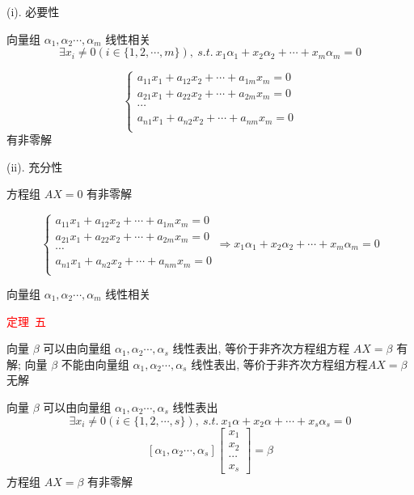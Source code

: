 \begin{theorem}[判别线性相关性的七大定理]
	\begin{anymark}[证明]
		(i). 必要性
		
		向量组 $\alpha_{1},\alpha_{2}\cdots,\alpha_{m}$ 线性相关  
		$$\exists x_{i}\neq 0(i\in \{1,2,\cdots,m\}),\ s.t.\ x_{1}\alpha_{1}+x_{2}\alpha_{2}+\cdots+x_{m}\alpha_{m}=0$$

		$$\begin{cases}
			a_{11}x_{1}+a_{12}x_{2}+\cdots+a_{1m}x_{m}=0\\
			a_{21}x_{1}+a_{22}x_{2}+\cdots+a_{2m}x_{m}=0\\
			\cdots\\
			a_{n1}x_{1}+a_{n2}x_{2}+\cdots+a_{nm}x_{m}=0\\
		\end{cases}$$
		有非零解
		
		(ii). 充分性
		
		方程组 $AX=0$ 有非零解

		$$\begin{cases}
			a_{11}x_{1}+a_{12}x_{2}+\cdots+a_{1m}x_{m}=0\\
			a_{21}x_{1}+a_{22}x_{2}+\cdots+a_{2m}x_{m}=0\\
			\cdots\\
			a_{n1}x_{1}+a_{n2}x_{2}+\cdots+a_{nm}x_{m}=0\\
		\end{cases}\Rightarrow
		x_{1}\alpha_{1}+x_{2}\alpha_{2}+\cdots+x_{m}\alpha_{m}=0$$
		
		向量组 $\alpha_{1},\alpha_{2}\cdots,\alpha_{m}$ 线性相关
	\end{anymark}
	
	\textcolor{red}{定理\ 五}
	
	向量 $\beta$ 可以由向量组 $\alpha_{1},\alpha_{2}\cdots,\alpha_{s}$ 线性表出, 等价于非齐次方程组方程 $AX=\beta$ 有解;
	向量 $\beta$ 不能由向量组 $\alpha_{1},\alpha_{2}\cdots,\alpha_{s}$ 线性表出, 等价于非齐次方程组方程$AX=\beta$无解
	\begin{anymark}[证明]

		向量 $\beta$ 可以由向量组 $\alpha_{1},\alpha_{2}\cdots,\alpha_{s}$ 线性表出
		$$\exists x_{i}\neq 0(i\in \{1,2,\cdots,s\}),\ s.t.\ x_{1}\alpha + x_{2}\alpha + \cdots + x_{s}\alpha_{s} = 0$$  
		$$[\alpha_{1},\alpha_{2}\cdots,\alpha_{s}]\begin{bmatrix}
			x_{1}\\
			x_{2}\\
			\cdots\\
			x_{s}
		\end{bmatrix} =\beta$$
		方程组 $AX=\beta$ 有非零解
	\end{anymark}
	

\end{theorem}

